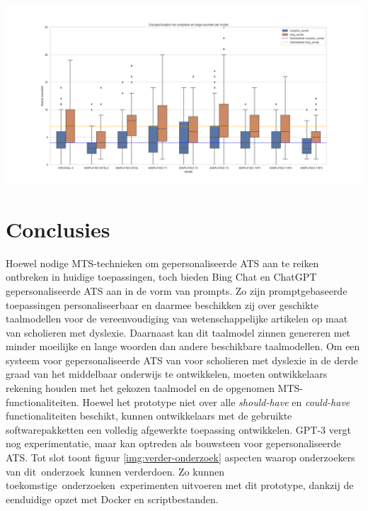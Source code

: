 \documentclass[a0,portrait]{hogent-poster}
\begin{document}
\begin{multicols}{2}
\begin{center}
	\captionsetup{type=figure}
	\includegraphics[width=1.0\linewidth]{figures/boxplot-poster.png}
	\label{img:results}
\end{center}


\section{Conclusies}
Hoewel nodige MTS-technieken om gepersonaliseerde ATS aan te reiken ontbreken in huidige toepassingen, toch bieden Bing Chat en ChatGPT gepersonaliseerde ATS aan in de vorm van prompts. Zo zijn promptgebaseerde toepassingen personaliseerbaar en daarmee beschikken zij over geschikte taalmodellen voor de vereenvoudiging van wetenschappelijke artikelen op maat van scholieren met dyslexie. Daarnaast kan dit taalmodel zinnen genereren met minder moeilijke en lange woorden dan andere beschikbare taalmodellen. Om een systeem voor gepersonaliseerde ATS van voor scholieren met dyslexie in de derde graad van het middelbaar onderwijs te ontwikkelen, moeten ontwikkelaars rekening houden met het gekozen taalmodel en de opgenomen MTS-functionaliteiten. Hoewel het prototype niet over alle \textit{should-have} en \textit{could-have} functionaliteiten beschikt, kunnen ontwikkelaars met de gebruikte softwarepakketten een volledig afgewerkte toepassing ontwikkelen.  GPT-3 vergt nog experimentatie, maar kan optreden als bouwsteen voor gepersonaliseerde ATS. Tot slot toont figuur \ref{img:verder-onderzoek} aspecten waarop onderzoekers van dit onderzoek kunnen verderdoen. Zo kunnen toekomstige onderzoeken experimenten uitvoeren met dit prototype, dankzij de eenduidige opzet met Docker en scriptbestanden.


\end{multicols}
\end{document}
